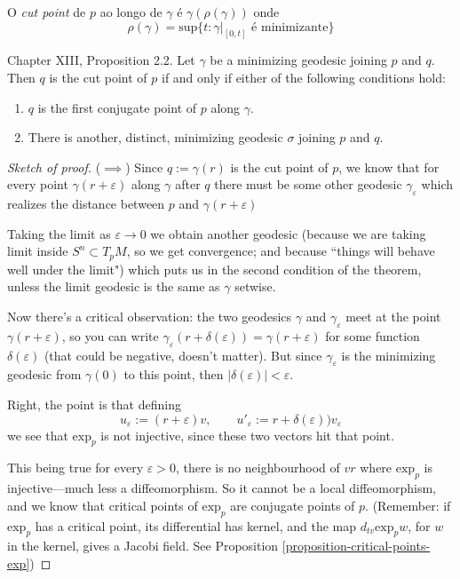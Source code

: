 \begin{definition}
\label{definition-cut-point}
O {\it cut point} de  $p$ ao longo de $\gamma$ é $\gamma(\rho(\gamma))$ 
onde
$$
\rho(\gamma)=\text{sup}\{t:\gamma|_{[0,t]}\text{ é minimizante}\}
$$

\end{definition}

\begin{proposition}
\label{proposition-cut-point-characterization}
\cite{doc} Chapter XIII, Proposition 2.2. Let $\gamma$ be a minimizing geodesic joining $p$ and $q$. Then $q$ is the cut
point of $p$ if and only if either of the following conditions hold:
\begin{enumerate}
\item $q$ is the first conjugate point of $p$ along $\gamma$.
\item There is another, distinct, minimizing geodesic $\sigma$ joining $p$ and
 $q$.
\end{enumerate}
\end{proposition}

\begin{proof}[Sketch of proof]
($\implies$) Since $q:=\gamma(r)$ is the cut point of $p$, we know that for every point
$\gamma(r+\varepsilon)$ along $\gamma$ after $q$ there must be some other geodesic
$\gamma_\varepsilon$ which realizes the distance between $p$ and
$\gamma(r+\varepsilon)$

Taking the limit as $\varepsilon \to 0$ we obtain another geodesic
(because we are taking limit inside $S^n \subset T_pM$, so we get convergence;
and because ``things will behave well under the limit")
which puts us in the second condition of the theorem,
unless the limit geodesic is the same as  $\gamma$ setwise.

Now there's a critical observation:
the two geodesics $\gamma$ and $\gamma_\varepsilon$ meet at the point 
 $\gamma(r+\varepsilon)$, so you can write
 $\gamma_\varepsilon(r+\delta(\varepsilon))=\gamma(r+\varepsilon)$
 for some function $\delta(\varepsilon)$ (that could be negative, doesn't
 matter).
 But since $\gamma_\varepsilon$ is the minimizing
 geodesic from $\gamma(0)$ to this point, then
 $|\delta(\varepsilon)|<\varepsilon$.

Right, the point is that defining
$$
u_\varepsilon:=(r+\varepsilon)v,\qquad
u'_\varepsilon:=r+\delta(\varepsilon))v_\varepsilon
$$
we see that $\text{exp}_p$ is not injective, since these two vectors
hit that point.

This being true for every $\varepsilon>0$, there is no neighbourhood of $vr$ 
where $\text{exp}_p$ is injective---much less a diffeomorphism.
So it cannot be a local diffeomorphism, and we know that critical points of
$\text{exp}_p$ are conjugate points of $p$. (Remember: if
$\text{exp}_p$ has a critical point, its differential has kernel,
and the map $d_{tv}\text{exp}_pw$, for $w$ in the kernel, gives 
a Jacobi field. See Proposition \ref{proposition-critical-points-exp})
\end{proof}

